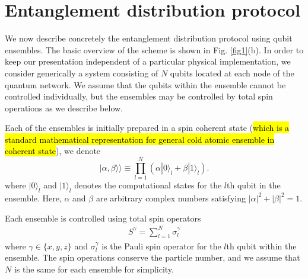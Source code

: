 \documentclass{WileyMSP-template}
\begin{document}
\section{Entanglement distribution protocol}

We now describe concretely the entanglement distribution protocol using qubit ensembles. The basic overview of the scheme is shown in Fig. \ref{fig1}(b).  In order to keep our presentation independent of a particular physical implementation, we consider generically a system consisting of $ N $ qubits located at each node of the quantum network.  We assume that the qubits within the ensemble cannot be controlled individually, but the ensembles may be controlled by total spin operations as we describe below.

Each of the ensembles is initially prepared in a spin coherent state (\hl{which is a standard mathematical representation for general cold atomic ensemble in coherent state}), we denote
%
\begin{equation}
\label{ensemblequbit}
|\alpha,\beta\rangle\rangle\equiv \prod_{l=1}^N (\alpha |0\rangle_l +\beta |1 \rangle_l).
\end{equation}
%
where $ |0\rangle_l $ and $ |1\rangle_l $ denotes the computational states for the $l$th qubit in the ensemble.  Here, $\alpha$ and $\beta$ are arbitrary complex numbers satisfying $|\alpha|^2+|\beta|^2=1$.

Each ensemble is controlled using total spin operators
%
\begin{align}
S^\gamma = \sum_{l=1}^N \sigma_l^\gamma
\end{align}
%
where $\gamma \in\{ x, y, z \} $ and $ \sigma_l^\gamma $ is the Pauli spin operator for the $ l $th qubit within the ensemble.  The spin operations conserve the particle number, and we assume that $ N $ is the same for each ensemble for simplicity.
\end{document}
